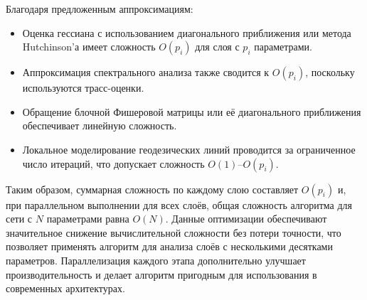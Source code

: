 \documentclass[a4paper,12pt]{article}
\begin{document}
Благодаря предложенным аппроксимациям:
\begin{itemize}
    \item Оценка гессиана с использованием диагонального приближения или метода Hutchinson’а имеет сложность \( O(p_i) \) для слоя с \( p_i \) параметрами.
    \item Аппроксимация спектрального анализа также сводится к \( O(p_i) \), поскольку используются трасс-оценки.
    \item Обращение блочной Фишеровой матрицы или её диагонального приближения обеспечивает линейную сложность.
    \item Локальное моделирование геодезических линий проводится за ограниченное число итераций, что допускает сложность \( O(1) \)–\( O(p_i) \).
\end{itemize}
Таким образом, суммарная сложность по каждому слою составляет \( O(p_i) \) и, при параллельном выполнении для всех слоёв, общая сложность алгоритма для сети с \( N \) параметрами равна \( O(N) \). Данные оптимизации обеспечивают значительное снижение вычислительной сложности без потери точности, что позволяет применять алгоритм для анализа слоёв с несколькими десятками параметров. Параллелизация каждого этапа дополнительно улучшает производительность и делает алгоритм пригодным для использования в современных архитектурах.
\end{document}
